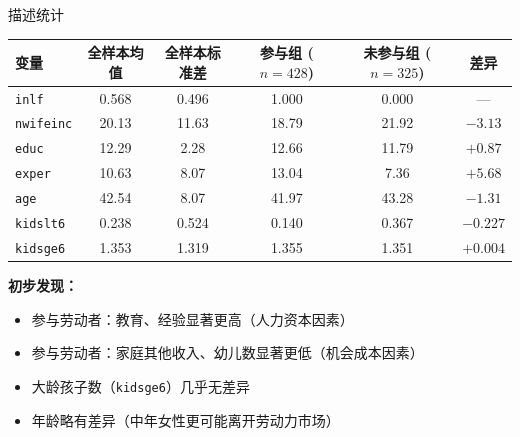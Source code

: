 \documentclass[aspectratio=169, 10pt]{beamer}
\begin{document}
\begin{frame}{描述统计}

  \begin{center}\footnotesize
  \begin{tabular}{l|c|c|c|c|c}
  \hline
  变量 & 全样本均值 & 全样本标准差 & 参与组 ($n=428$) & 未参与组 ($n=325$) & 差异 \\
  \hline
  \texttt{inlf} & 0.568 & 0.496 & 1.000 & 0.000 & --- \\
  \texttt{nwifeinc} & 20.13 & 11.63 & 18.79 & 21.92 & $-3.13$ \\
  \texttt{educ} & 12.29 & 2.28 & 12.66 & 11.79 & $+0.87$ \\
  \texttt{exper} & 10.63 & 8.07 & 13.04 & 7.36 & $+5.68$ \\
  \texttt{age} & 42.54 & 8.07 & 41.97 & 43.28 & $-1.31$ \\
  \texttt{kidslt6} & 0.238 & 0.524 & 0.140 & 0.367 & $-0.227$ \\
  \texttt{kidsge6} & 1.353 & 1.319 & 1.355 & 1.351 & $+0.004$ \\
  \hline
  \end{tabular}
  \end{center}

  \begin{highlightbox}
    \textbf{初步发现：}
    \begin{itemize}\setlength{\itemsep}{1pt}
      \item 参与劳动者：教育、经验显著更高（人力资本因素）
      \item 参与劳动者：家庭其他收入、幼儿数显著更低（机会成本因素）
      \item 大龄孩子数（\texttt{kidsge6}）几乎无差异
      \item 年龄略有差异（中年女性更可能离开劳动力市场）
    \end{itemize}
  \end{highlightbox}

\end{frame}
\end{document}
